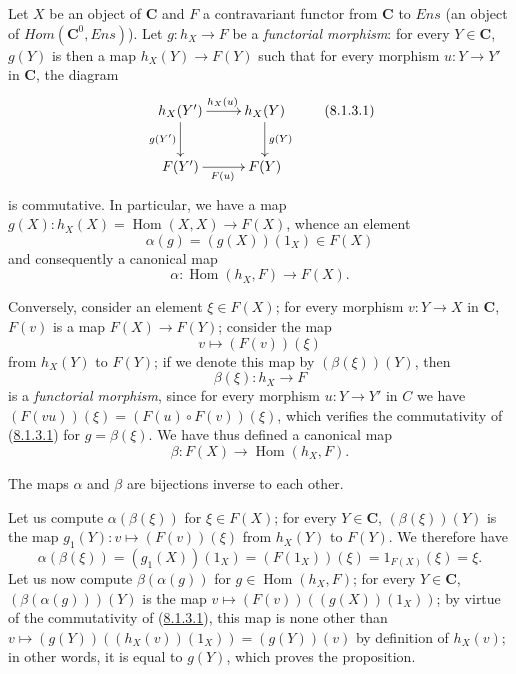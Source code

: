 \begin{env}[8.1.3]
\label{0.8.1.3}
Let $X$ be an object of $\boldsymbol{C}$ and $F$ a contravariant functor from $\boldsymbol{C}$ to
$\boldsymbol{\mathit{Ens}}$ (an object of $\boldsymbol{\mathit{Hom}}(\boldsymbol{C}^0,\boldsymbol{\mathit{Ens}})$). Let
$g:h_X\to F$ be a \emph{functorial morphism}: for every $Y\in\boldsymbol{C}$,
$g(Y)$ is then a map $h_X(Y)\to F(Y)$ such that for every morphism
$u:Y\to Y'$ in $\boldsymbol{C}$, the diagram
\[
  \xymatrix{
    h_X(Y')\ar[r]^{h_X(u)}\ar[d]_{g(Y')} &
    h_X(Y)\ar[d]^{g(Y)}\\
    F(Y')\ar[r]_{F(u)} & F(Y)
  }
  \tag{8.1.3.1}\label{0.8.1.3.1}
\]
is commutative. In particular, we have a map
$g(X):h_X(X)=\operatorname{Hom}(X,X)\to F(X)$, whence an element
\[
  \alpha(g)=(g(X))(1_X)\in F(X)
  \tag{8.1.3.2}\label{0.8.1.3.2}
\]
and consequently a canonical map
\[
  \alpha:\operatorname{Hom}(h_X,F)\to F(X).
  \tag{8.1.3.3}\label{0.8.1.3.3}
\]

Conversely, consider an element $\xi\in F(X)$; for every morphism
$v:Y\to X$ in $\boldsymbol{C}$, $F(v)$ is a map $F(X)\to F(Y)$;
consider the map
\[
  v\mapsto(F(v))(\xi)
  \tag{8.1.3.4}\label{0.8.1.3.4}
\]
from $h_X(Y)$ to $F(Y)$; if we denote this map by
$(\beta(\xi))(Y)$, then
\[
  \beta(\xi):h_X\to F
  \tag{8.1.3.5}\label{0.8.1.3.5}
\]
is a \emph{functorial morphism}, since for every morphism
$u:Y\to Y'$ in $C$ we have
$(F(vu))(\xi)=(F(u)\circ F(v))(\xi)$, which verifies the commutativity of
(\hyperref[0.8.1.3.1]{8.1.3.1}) for $g=\beta(\xi)$. We have thus defined
a canonical map
\[
  \beta:F(X)\to\operatorname{Hom}(h_X,F).
  \tag{8.1.3.6}\label{0.8.1.3.6}
\]
\end{env}

\begin{proposition}[8.1.4]
\label{0.8.1.4}
The maps $\alpha$ and $\beta$ are bijections inverse to each
other.
\end{proposition}

Let us compute $\alpha(\beta(\xi))$ for $\xi\in F(X)$; for every $Y\in\boldsymbol{C}$,
$(\beta(\xi))(Y)$ is the map
$g_1(Y):v\mapsto(F(v))(\xi)$ from $h_X(Y)$ to $F(Y)$. We therefore have
\[
  \alpha(\beta(\xi))=(g_1(X))(1_X)=(F(1_X))(\xi)
  =1_{F(X)}(\xi)=\xi.
\]
Let us now compute $\beta(\alpha(g))$ for
$g\in\operatorname{Hom}(h_X,F)$; for every $Y\in\boldsymbol{C}$,
$(\beta(\alpha(g)))(Y)$ is the map
$v\mapsto(F(v))((g(X))(1_X))$; by virtue of the commutativity of
(\hyperref[0.8.1.3.1]{8.1.3.1}), this map is none other than
$v\mapsto(g(Y))((h_X(v))(1_X))=(g(Y))(v)$ by definition of $h_X(v)$;
in other words, it is equal to $g(Y)$, which proves the proposition.

